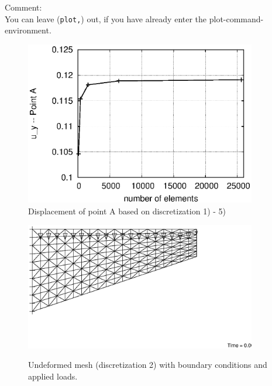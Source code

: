 \documentclass[12pt,twoside]{article}
\begin{document}
Comment:\\[1mm]
You can leave (\verb/plot,/) out, if you have already enter the plot-command-environment.


\clearpage

\begin{figure}[h]
\includegraphics[width=0.9\textwidth]{disp.eps}
\caption{Displacement of point {\sf A} based on discretization 1) - 5)}
\end{figure}
\begin{figure}[h]
\includegraphics[width=0.9\textwidth]{mesh_bounds_loads.eps}\\
\caption{Undeformed mesh (discretization 2) with boundary conditions and applied loads.}
\end{figure}

\clearpage
\end{document}
